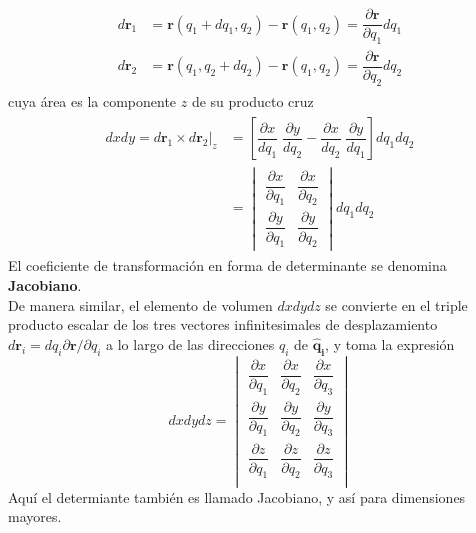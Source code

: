 \begin{eqnarray}
\begin{aligned}
d \mathbf{r}_{1} &= \mathbf{r} (q_{1} + dq_{1}, q_{2}) - \mathbf{r}(q_{1},q_{2}) = \dfrac{\partial \mathbf{r}}{\partial q_{1}} dq_{1} \\
d \mathbf{r}_{2} &= \mathbf{r} (q_{1}, q_{2} + dq_{2}) - \mathbf{r}(q_{1},q_{2}) = \dfrac{\partial \mathbf{r}}{\partial q_{2}} dq_{2}
\end{aligned}
\label{eq:ecuacion_02_14}
\end{eqnarray}
cuya área es la componente $z$ de su producto cruz
\begin{eqnarray}
\begin{aligned}
dx dy = d \mathbf{r}_{1} \times d \mathbf{r}_{2} \big\vert_{z} &= \left[ \dfrac{\partial x}{dq_{1}} \; \dfrac{\partial y}{dq_{2}} - \dfrac{\partial x}{dq_{2}} \; \dfrac{\partial y}{dq_{1}} \right] dq_{1} dq_{2} \\
&= \begin{vmatrix}
\dfrac{\partial x}{\partial q_{1}} & \dfrac{\partial x}{\partial q_{2}} \\[1em]
\dfrac{\partial y}{\partial q_{1}} & \dfrac{\partial y}{\partial q_{2}} 
\end{vmatrix} dq_{1} d q_{2}
\end{aligned}
\label{eq:ecuacion_02_15}
\end{eqnarray}
El coeficiente de transformación en forma de determinante se denomina \textbf{Jacobiano}.
\\
De manera similar, el elemento de volumen $dx dy dz$ se convierte en el triple producto escalar de los tres vectores infinitesimales de desplazamiento $d \mathbf{r}_{i}  = d q_{i} \partial \mathbf{r} / \partial q_{i} $ a lo largo de las direcciones $q_{i}$ de $\mathbf{\widehat{q}_{i}}$, y toma la expresión
\begin{equation}
dx dy dz = \begin{vmatrix}
\dfrac{\partial x}{\partial q_{1}} & \dfrac{\partial x}{\partial q_{2}} & \dfrac{\partial x}{\partial q_{3}} \\[1em]
\dfrac{\partial y}{\partial q_{1}} & \dfrac{\partial y}{\partial q_{2}} & \dfrac{\partial y}{\partial q_{3}} \\[1em]
\dfrac{\partial z}{\partial q_{1}} & \dfrac{\partial z}{\partial q_{2}} & \dfrac{\partial z}{\partial q_{3}} \\
\end{vmatrix}
\label{eq:ecuacion_02_16}
\end{equation}
Aquí el determiante también es llamado Jacobiano, y así para dimensiones mayores.
